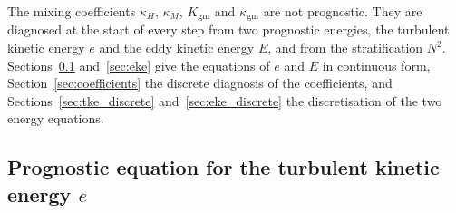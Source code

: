 \documentclass{article}
\begin{document}
The mixing coefficients $\kappa_H$, $\kappa_M$, $K_\text{gm}$ and $\kappa_\text{gm}$ are not prognostic. They are diagnosed at the start of every step from two prognostic energies, the turbulent kinetic energy $e$ and the eddy kinetic energy $E$, and from the stratification $N^2$.
Sections~\ref{sec:tke} and~\ref{sec:eke} give the equations of $e$ and $E$ in continuous form, Section~\ref{sec:coefficients} the discrete diagnosis of the coefficients, and Sections~\ref{sec:tke_discrete} and~\ref{sec:eke_discrete} the discretisation of the two energy equations.

\subsection{\texorpdfstring{Prognostic equation for the turbulent kinetic energy $e$}{Prognostic equation for the turbulent kinetic energy e}}\label{sec:tke}
\end{document}
